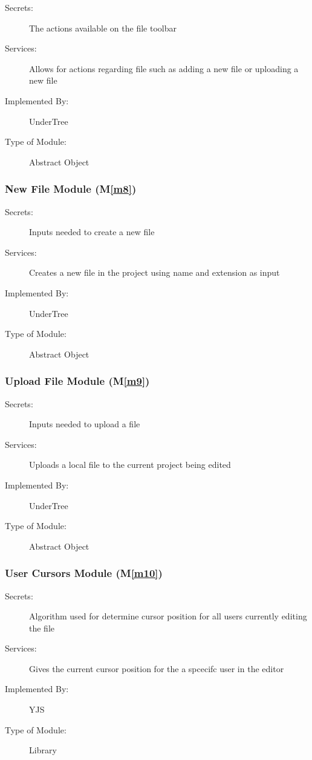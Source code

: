 \documentclass[12pt, titlepage]{article}
\newcommand{\mref}[1]{M\ref{#1}}
\begin{document}
	\begin{description}
		\item[Secrets:] The actions available on the file toolbar
		\item[Services:] Allows for actions regarding file such as adding a new file or uploading a new file
		\item[Implemented By:] UnderTree
		\item[Type of Module:] Abstract Object
	\end{description}
	
	\subsubsection{New File Module (\mref{m8})}
	
	\begin{description}
		\item[Secrets:] Inputs needed to create a new file
		\item[Services:] Creates a new file in the project using name and extension as input
		\item[Implemented By:] UnderTree
		\item[Type of Module:] Abstract Object
	\end{description}
	
	\subsubsection{Upload File Module (\mref{m9})}
	
	\begin{description}
		\item[Secrets:] Inputs needed to upload a file
		\item[Services:] Uploads a local file to the current project being edited
		\item[Implemented By:] UnderTree
		\item[Type of Module:] Abstract Object
	\end{description}
	
	\subsubsection{User Cursors Module (\mref{m10})}
	
	\begin{description}
		\item[Secrets:] Algorithm used for determine cursor position for all users currently editing the file
		\item[Services:] Gives the current cursor position for the a spcecifc user in the editor
		\item[Implemented By:] YJS
		\item[Type of Module:] Library
	\end{description}
	
\end{document}

